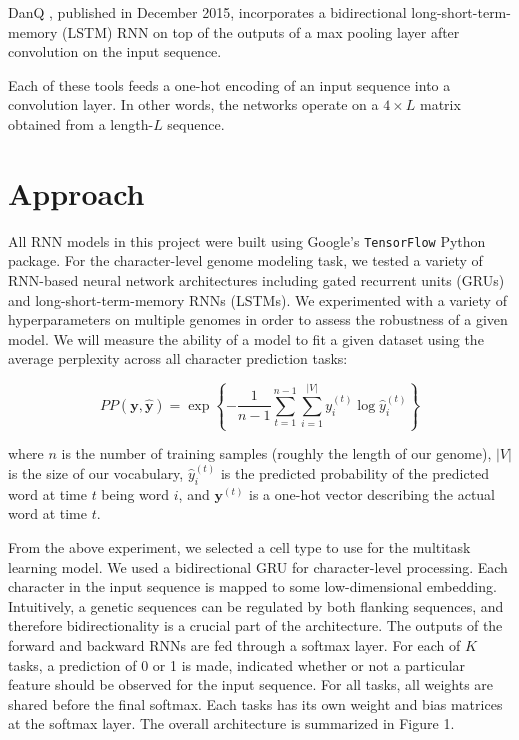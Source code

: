 \documentclass{article} %
\begin{document}
DanQ \cite{quang2015danq}, published in December 2015, incorporates a bidirectional long-short-term-memory (LSTM) RNN on top of the outputs of a max pooling layer after convolution on the input sequence.

Each of these tools feeds a one-hot encoding of an input sequence into a convolution layer. In other words, the networks operate on a $4\times L$ matrix obtained from a length-$L$ sequence. 

\section{Approach}

All RNN models in this project were built using Google's \texttt{TensorFlow} Python package. For the character-level genome modeling task, we tested a variety of RNN-based neural network architectures including gated recurrent units (GRUs) and long-short-term-memory RNNs (LSTMs). We experimented with a variety of hyperparameters on multiple genomes in order to assess the robustness of a given model. We will measure the ability of a model to fit a given dataset using the average perplexity across all character prediction tasks:

$$
	PP(\mathbf{y},\mathbf{\hat{y}}) = \exp \left\{-\frac{1}{n-1} \sum_{t=1}^{n-1} \sum_{i=1}^{|V|} y_i^{(t)} \log \hat{y}_i^{(t)}\right\}
$$

where $n$ is the number of training samples (roughly the length of our genome), $|V|$ is the size of our vocabulary, $\hat{y}^{(t)}_i$ is the predicted probability of the predicted word at time $t$ being word $i$, and $\mathbf{y}^{(t)}$ is a one-hot vector describing the actual word at time $t$.

From the above experiment, we selected a cell type to use for the multitask learning model. We used a bidirectional GRU for character-level processing. Each character in the input sequence is mapped to some low-dimensional embedding. Intuitively, a genetic sequences can be regulated by both flanking sequences, and therefore bidirectionality is a crucial part of the architecture. The outputs of the forward and backward RNNs are fed through a softmax layer. For each of $K$ tasks, a prediction of 0 or 1 is made, indicated whether or not a particular feature should be observed for the input sequence. For all tasks, all weights are shared before the final softmax. Each tasks has its own weight and bias matrices at the softmax layer. The overall architecture is summarized in Figure 1.
\end{document}
